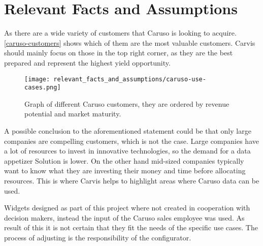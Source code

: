 \chapter{Relevant Facts and Assumptions}

As there are a wide variety of customers that Caruso is looking to acquire. \autoref{caruso-customers} shows which of them are the most valuable customers. Carvis should mainly focus on those in the top right corner, as they are the best prepared and represent the highest yield opportunity.

\begin{figure}[ht]
  \centering
  \texttt{[image: relevant\_facts\_and\_assumptions/caruso-use-cases.png]}
  \caption{Graph of different Caruso customers, they are ordered by revenue potential and market maturity.}
  \label{caruso-customers}
\end{figure}

A possible conclusion to the aforementioned statement could be that only large companies are compelling customers, which is not the case. Large companies have a lot of resources to invest in innovative technologies, so the demand for a data appetizer Solution is lower. On the other hand mid-sized companies typically want to know what they are investing their money and time before allocating resources. This is where Carvis helps to highlight areas where Caruso data can be used.

Widgets designed as part of this project where not created in cooperation with decision makers, instead the input of the Caruso sales employee was used. As result of this it is not certain that they fit the needs of the specific use cases. The process of adjusting is the responsibility of the configurator.